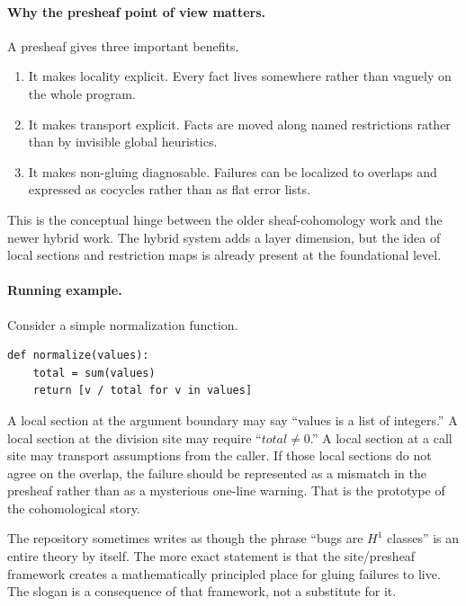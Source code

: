 \paragraph{Why the presheaf point of view matters.}
A presheaf gives \DepPy{} three important benefits.
\begin{enumerate}[leftmargin=*, itemsep=0.4em]
  \item It makes locality explicit. Every fact lives somewhere rather than vaguely on the
  whole program.
  \item It makes transport explicit. Facts are moved along named restrictions rather than by
  invisible global heuristics.
  \item It makes non-gluing diagnosable. Failures can be localized to overlaps and expressed
  as cocycles rather than as flat error lists.
\end{enumerate}

This is the conceptual hinge between the older sheaf-cohomology work and the newer hybrid
work. The hybrid system adds a layer dimension, but the idea of local sections and
restriction maps is already present at the foundational level.

\paragraph{Running example.}
Consider a simple normalization function.
\begin{lstlisting}
def normalize(values):
    total = sum(values)
    return [v / total for v in values]
\end{lstlisting}
A local section at the argument boundary may say ``values is a list of integers.'' A
local section at the division site may require ``$total \neq 0$.'' A local section at a call
site may transport assumptions from the caller. If those local sections do not agree on
the overlap, the failure should be represented as a mismatch in the presheaf rather than
as a mysterious one-line warning. That is the prototype of the cohomological story.

\begin{remark}
The repository sometimes writes as though the phrase ``bugs are $H^1$ classes'' is an
entire theory by itself. The more exact statement is that the site/presheaf framework
creates a mathematically principled place for gluing failures to live. The slogan is a
consequence of that framework, not a substitute for it.
\end{remark}
